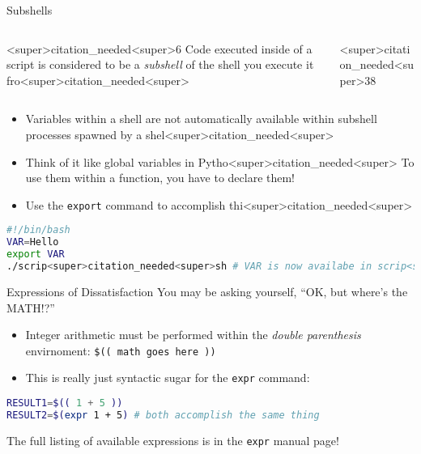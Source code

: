 \documentclass[11pt]{beamer}
\begin{document}
\begin{frame}[fragile=singleslide]{Subshells}
\begin{columns}
\begin{column}{<super>citation_needed<super>6\textwidth}
Code executed inside of a script is considered to be a \textit{subshell} of the shell you execute it fro<super>citation_needed<super>  
\end{column}
\begin{column}{<super>citation_needed<super>38\textwidth}
\vspace{-<super>citation_needed<super>5em}
\center
\
\end{column}
\end{columns}
\begin{itemize}
\item Variables within a shell are not automatically available within subshell processes spawned by a shel<super>citation_needed<super>  
\item Think of it like global variables in Pytho<super>citation_needed<super>  To use them within a function, you have to declare them!
\item Use the \texttt{export} command to accomplish thi<super>citation_needed<super>
\end{itemize}
\begin{lstlisting}[style=terminal, language=bash]
#!/bin/bash
VAR=Hello
export VAR
./scrip<super>citation_needed<super>sh # VAR is now availabe in scrip<super>citation_needed<super>sh
\end{lstlisting}
\end{frame}

\begin{frame}[fragile=singleslide]{Expressions of Dissatisfaction}
You may be asking yourself, ``OK, but where's the MATH!?''
\begin{itemize}
\item Integer arithmetic must be performed within the \textit{double parenthesis} envirnoment: \texttt{\$(( math goes here ))}
\item This is really just syntactic sugar for the \texttt{expr} command:
\end{itemize}
\begin{lstlisting}[style=terminal, language=bash]
RESULT1=$(( 1 + 5 ))
RESULT2=$(expr 1 + 5) # both accomplish the same thing
\end{lstlisting}
The full listing of available expressions is in the \texttt{expr} manual page!
\end{frame}
\end{document}
